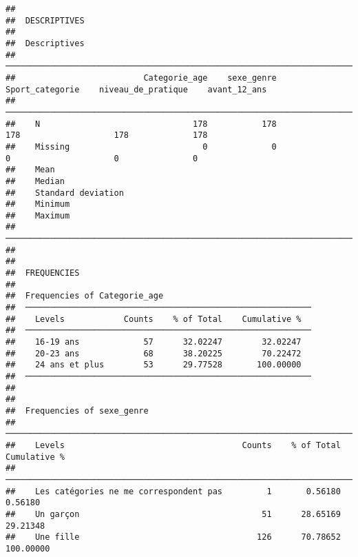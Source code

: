 \documentclass[
]{article}
\begin{document}
\begin{verbatim}
## 
##  DESCRIPTIVES
## 
##  Descriptives                                                                                                   
##  ────────────────────────────────────────────────────────────────────────────────────────────────────────────── 
##                          Categorie_age    sexe_genre    Sport_categorie    niveau_de_pratique    avant_12_ans   
##  ────────────────────────────────────────────────────────────────────────────────────────────────────────────── 
##    N                               178           178                178                   178             178   
##    Missing                           0             0                  0                     0               0   
##    Mean                                                                                                         
##    Median                                                                                                       
##    Standard deviation                                                                                           
##    Minimum                                                                                                      
##    Maximum                                                                                                      
##  ────────────────────────────────────────────────────────────────────────────────────────────────────────────── 
## 
## 
##  FREQUENCIES
## 
##  Frequencies of Categorie_age                               
##  ────────────────────────────────────────────────────────── 
##    Levels            Counts    % of Total    Cumulative %   
##  ────────────────────────────────────────────────────────── 
##    16-19 ans             57      32.02247        32.02247   
##    20-23 ans             68      38.20225        70.22472   
##    24 ans et plus        53      29.77528       100.00000   
##  ────────────────────────────────────────────────────────── 
## 
## 
##  Frequencies of sexe_genre                                                          
##  ────────────────────────────────────────────────────────────────────────────────── 
##    Levels                                    Counts    % of Total    Cumulative %   
##  ────────────────────────────────────────────────────────────────────────────────── 
##    Les catégories ne me correspondent pas         1       0.56180         0.56180   
##    Un garçon                                     51      28.65169        29.21348   
##    Une fille                                    126      70.78652       100.00000   

\end{verbatim}
\end{document}
